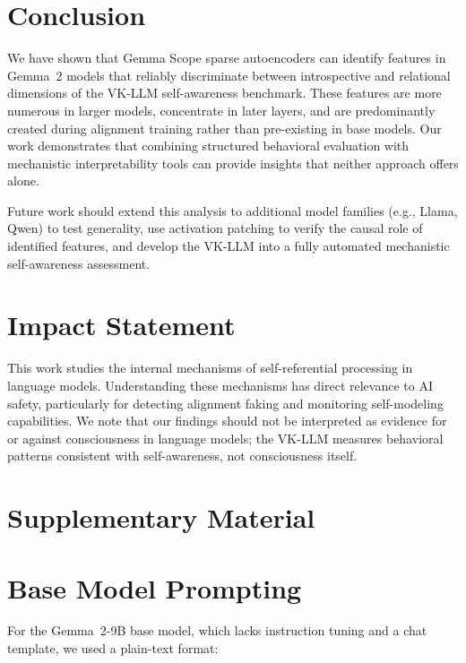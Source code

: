 \documentclass{article}
\begin{document}
\section{Conclusion}
\label{sec:conclusion}

We have shown that Gemma Scope sparse autoencoders can identify features in Gemma~2 models that reliably discriminate between introspective and relational dimensions of the VK-LLM self-awareness benchmark.
These features are more numerous in larger models, concentrate in later layers, and are predominantly created during alignment training rather than pre-existing in base models.
Our work demonstrates that combining structured behavioral evaluation with mechanistic interpretability tools can provide insights that neither approach offers alone.

Future work should extend this analysis to additional model families (e.g., Llama, Qwen) to test generality, use activation patching to verify the causal role of identified features, and develop the VK-LLM into a fully automated mechanistic self-awareness assessment.

\section*{Impact Statement}
This work studies the internal mechanisms of self-referential processing in language models.
Understanding these mechanisms has direct relevance to AI safety, particularly for detecting alignment faking and monitoring self-modeling capabilities.
We note that our findings should not be interpreted as evidence for or against consciousness in language models; the VK-LLM measures behavioral patterns consistent with self-awareness, not consciousness itself.





\newpage
\appendix
\onecolumn

\section*{\LARGE Supplementary Material}

\section{Base Model Prompting}
\label{app:base}

For the Gemma~2-9B base model, which lacks instruction tuning and a chat template, we used a plain-text format:
\end{document}
